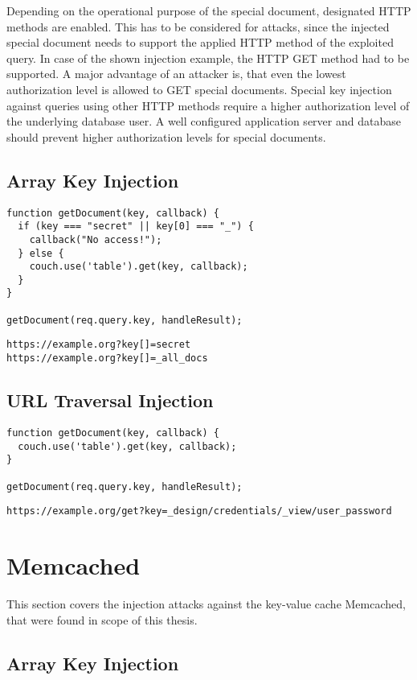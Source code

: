 Depending on the operational purpose of the special document, designated HTTP methods are enabled. This has to be considered for attacks, since the injected special document needs to support the applied HTTP method of the exploited query. In case of the shown injection example, the HTTP GET method had to be supported. A major advantage of an attacker is, that even the lowest authorization level is allowed to GET special documents. Special key injection against queries using other HTTP methods require a higher authorization level of the underlying database user. A well configured application server and database should prevent higher authorization levels for special documents. \\

\subsection{Array Key Injection}

\begin{lstlisting}[caption={Vulnerable NodeJS example for array key injection on CouchDB}, label={lst:PHPArrayInjection}]
function getDocument(key, callback) {
  if (key === "secret" || key[0] === "_") {
    callback("No access!");
  } else {
    couch.use('table').get(key, callback);
  }
}

getDocument(req.query.key, handleResult);
\end{lstlisting}

\begin{lstlisting}[caption={Attack vectors on CouchDB for array key injection via HTTP GET}, label={lst:PHPArrayInjection}]
https://example.org?key[]=secret
https://example.org?key[]=_all_docs
\end{lstlisting}

\subsection{URL Traversal Injection}

\begin{lstlisting}[caption={Vulnerable NodeJS example for URL traversal injection on CouchDB}, label={lst:PHPArrayInjection}]
function getDocument(key, callback) {
  couch.use('table').get(key, callback);
}

getDocument(req.query.key, handleResult);
\end{lstlisting}

\begin{lstlisting}[caption={Attack vectors on CouchDB for URL traversal injection via HTTP GET}, label={lst:PHPArrayInjection}]
https://example.org/get?key=_design/credentials/_view/user_password
\end{lstlisting}

\section{Memcached}
This section covers the injection attacks against the key-value cache Memcached, that were found in scope of this thesis.
\subsection{Array Key Injection}